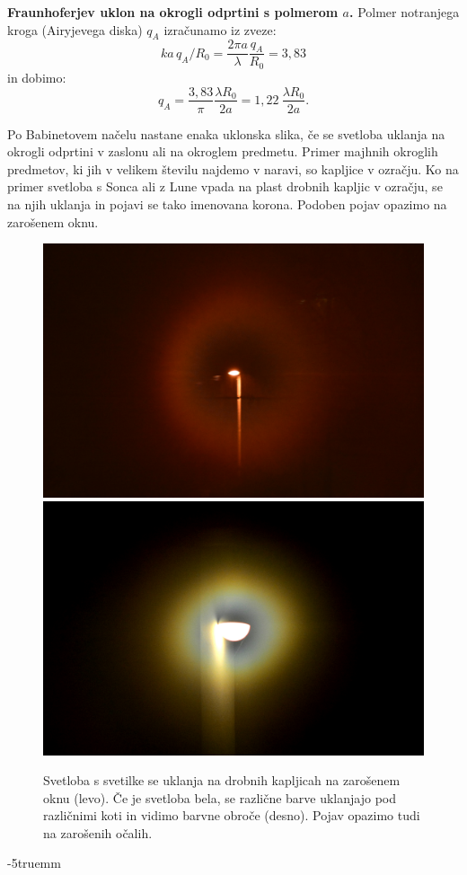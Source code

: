 \begin{example}{\bf Fraunhoferjev uklon na okrogli odprtini s polmerom $a$.}
Polmer notranjega kroga (Airyjevega diska) $q_A$ izračunamo iz zveze:
\begin{equation}
ka\,q_A/R_0 = \frac{2\pi a}{\lambda}\frac{q_A}{R_0} = 3,83
\label{eq:05_41}
\end{equation}
in dobimo:
\begin{equation}
q_A = \frac{3,83}{\pi}\frac{\lambda R_0}{2a} = 1,22~\frac{\lambda R_0}{2a}.
\label{eq:05_42}
\end{equation}

Po Babinetovem načelu nastane enaka uklonska slika, če se svetloba uklanja
na okrogli odprtini v zaslonu ali na okroglem predmetu. Primer majhnih okroglih
predmetov, ki jih v velikem številu najdemo v naravi, so kapljice v ozračju. Ko na primer svetloba
s Sonca ali z Lune vpada na plast drobnih kapljic v ozračju, se na njih uklanja in pojavi se
tako imenovana korona. Podoben pojav opazimo na zarošenem oknu. 
\begin{figure}[ht]
\centering
\includegraphics[width=70truemm]{slike/05_photos_svetilka.jpg}\hfill
\includegraphics[width=70truemm]{slike/05_photos_luc.jpg}
\caption{Svetloba s svetilke se uklanja na drobnih kapljicah na zarošenem oknu (levo). Če je svetloba
bela, se različne barve uklanjajo pod različnimi koti in vidimo barvne obroče (desno). Pojav 
opazimo tudi na zarošenih očalih.}
\label{fig:05_uklon_svetilka}
\end{figure}
\vglue-5truemm

\end{example}

